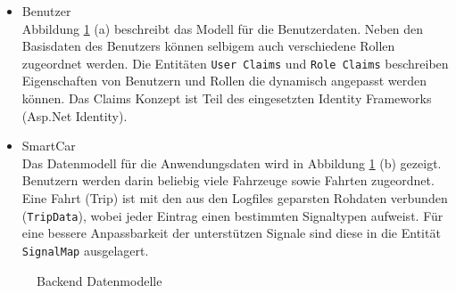 \begin{itemize}
\item Benutzer \\
Abbildung \ref{fig:backendDatamodels} (a) beschreibt das Modell für die Benutzerdaten. Neben den Basisdaten des Benutzers können selbigem auch verschiedene Rollen zugeordnet werden. Die Entitäten \texttt{User Claims} und \texttt{Role Claims} beschreiben Eigenschaften von Benutzern und Rollen die dynamisch angepasst werden können. Das Claims Konzept ist Teil des eingesetzten Identity Frameworks (Asp.Net Identity).
\item SmartCar \\
Das Datenmodell für die Anwendungsdaten wird in Abbildung \ref{fig:backendDatamodels} (b) gezeigt. Benutzern werden darin beliebig viele Fahrzeuge sowie Fahrten zugeordnet. Eine Fahrt (Trip) ist mit den aus den Logfiles geparsten Rohdaten verbunden (\texttt{TripData}), wobei jeder Eintrag einen bestimmten Signaltypen aufweist. Für eine bessere Anpassbarkeit der unterstützen Signale sind diese in die Entität \texttt{SignalMap} ausgelagert.
\end{itemize}

\begin{figure} 
\caption{Backend Datenmodelle} 
\label{fig:backendDatamodels}
\end{figure} 


